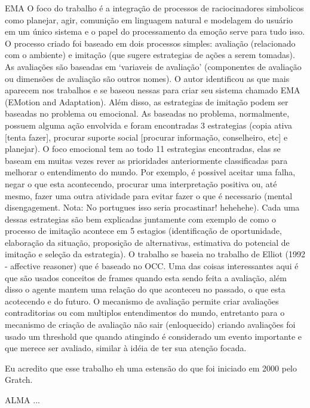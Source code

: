{EMA} %
\cite{gratch2004domain}
O foco do trabalho é a integração de processos de raciocinadores simbolicos
como planejar, agir, comunição em linguagem natural e modelagem do usuário em
um único sistema e o papel do processamento da emoção serve para tudo isso. O
processo criado foi baseado em dois processos simples: avaliação (relacionado
com o ambiente) e imitação (que sugere estrategias de ações a serem tomadas).
As avaliações são baseadas em `variaveis de avaliação' (componentes de
avaliação ou dimensões de avaliação são outros nomes). O autor identificou as
que mais aparecem nos trabalhos e se baseou nessas para criar seu sistema
chamado EMA (EMotion and Adaptation).
%
Além disso, as estrategias de imitação podem ser baseadas no problema ou
emocional. As baseadas no problema, normalmente, possuem alguma ação envolvida
e foram encontradas 3 estrategias (copia ativa [tenta fazer], procurar suporte
social [procurar informação, conselheiro, etc] e planejar). O foco emocional
tem ao todo 11 estrategias encontradas, elas se baseam em muitas vezes rever
as prioridades anteriormente classificadas para melhorar o entendimento do
mundo. Por exemplo, é possivel aceitar uma falha, negar o que esta
acontecendo, procurar uma interpretação positiva ou, até mesmo, fazer uma
outra atividade para evitar fazer o que é necessario (mental disengagement.
Nota: No portugues isso seria procastinar! hehehehe).  Cada uma dessas
estrategias são bem explicadas juntamente com exemplo de como o processo de
imitação acontece em 5 estagios (identificação de oportunidade, elaboração da
situação, proposição de alternativas, estimativa do potencial de imitação e
seleção da estrategia). O trabalho se baseia no trabalho de Elliot (1992 -
affective reasoner) que é baseado no OCC. Uma das coisas interessantes aqui é
que são usados conceitos de frames quando esta sendo feita a avaliação, além
disso o agente mantem uma relação do que aconteceu no passado, o que esta
acotecendo e do futuro. O mecanismo de avaliação permite criar avaliações
contraditorias ou com multiplos entendimentos do mundo, entretanto para o
mecanismo de criação de avaliação não sair (enloquecido) criando avaliações
foi usado um threshold que quando atingindo é considerado um evento importante
e que merece ser avaliado, similar à idéia de ter sua atenção focada.

Eu acredito que esse trabalho eh uma estensão do que foi iniciado em 2000 pelo
Gratch.

{ALMA} %
...

